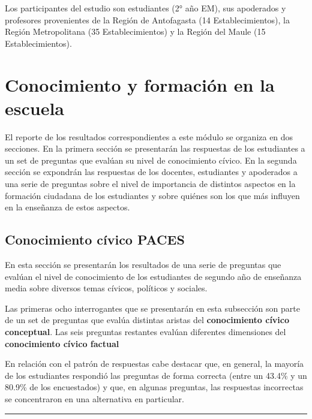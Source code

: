 \documentclass[
  14pt,
]{book}
\begin{document}
Los participantes del estudio son estudiantes (2° año EM), sus apoderados y profesores provenientes de la Región de Antofagasta (14 Establecimientos), la Región Metropolitana (35 Establecimientos) y la Región del Maule (15 Establecimientos).

\hypertarget{conocimiento-y-formaciuxf3n-en-la-escuela}{%
\chapter{Conocimiento y formación en la escuela}\label{conocimiento-y-formaciuxf3n-en-la-escuela}}

El reporte de los resultados correspondientes a este módulo se organiza en dos secciones. En la primera sección se presentarán las respuestas de los estudiantes a un set de preguntas que evalúan su nivel de conocimiento cívico. En la segunda sección se expondrán las respuestas de los docentes, estudiantes y apoderados a una serie de preguntas sobre el nivel de importancia de distintos aspectos en la formación ciudadana de los estudiantes y sobre quiénes son los que más influyen en la enseñanza de estos aspectos.

\hypertarget{conocimiento-cuxedvico-paces}{%
\section{Conocimiento cívico PACES}\label{conocimiento-cuxedvico-paces}}

En esta sección se presentarán los resultados de una serie de preguntas que evalúan el nivel de conocimiento de los estudiantes de segundo año de enseñanza media sobre diversos temas cívicos, políticos y sociales.

Las primeras ocho interrogantes que se presentarán en esta subsección son parte de un set de preguntas que evalúa distintas aristas del \textbf{conocimiento cívico conceptual}. Las seis preguntas restantes evalúan diferentes dimensiones del \textbf{conocimiento cívico factual}

En relación con el patrón de respuestas cabe destacar que, en general, la mayoría de los estudiantes respondió las preguntas de forma correcta (entre un 43.4\% y un 80.9\% de los encuestados) y que, en algunas preguntas, las respuestas incorrectas se concentraron en una alternativa en particular.

\begin{center}\rule{0.5\linewidth}{0.5pt}\end{center}
\end{document}
